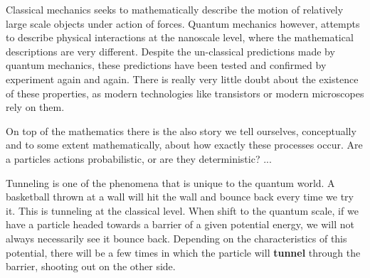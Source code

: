 Classical mechanics seeks to mathematically describe the motion of relatively large scale objects under action of forces. Quantum mechanics however, attempts to describe physical interactions at the nanoscale level, where the mathematical descriptions are very different. Despite the un-classical predictions made by quantum mechanics, these predictions have been tested and confirmed by experiment again and again. There is really very little doubt about the existence of these properties, as modern technologies like transistors or modern microscopes rely on them.

On top of the mathematics there is the also story we tell ourselves, conceptually and to some extent mathematically, about how exactly these processes occur. Are a particles actions probabilistic, or are they deterministic? ...

Tunneling is one of the phenomena that is unique to the quantum world. A basketball thrown at a wall will hit the wall and bounce back every time we try it. This is tunneling at the classical level. When shift to the quantum scale, if we have a particle headed towards a barrier of a given potential energy, we will not always necessarily see it bounce back. Depending on the characteristics of this potential, there will be a few times in which the particle will \textbf{tunnel} through the barrier, shooting out on the other side.   



    
